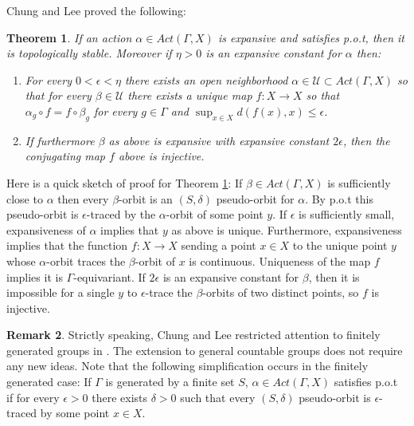 \documentclass[oneside,english]{amsart}
\newtheorem{thm}{Theorem}[section]
\theoremstyle{definition}
\newtheorem{remark}[thm]{Remark}
\newcommand{\Act}[2]{\mathit{Act}({#1},{#2})}
\begin{document}
Chung and Lee \cite[Theorem $2.8$]{1611.08994} proved the following:

\begin{thm}\label{thm:pot_stable}
If an action $\alpha \in \Act{\Gamma}{X}$ is expansive and satisfies p.o.t, then it is topologically stable.
Moreover if $\eta >0$ is an expansive constant for $\alpha$ then:
\begin{enumerate}
\item  For every $0 < \epsilon < \eta$ there exists an open neighborhood $\alpha \in \mathcal{U} \subset \Act{\Gamma}{X}$ so that for every $\beta \in \mathcal{U}$ there exists a unique map $f:X \to X$ so that $\alpha_g \circ f = f \circ \beta_g$ for every $g \in \Gamma$ and $\sup_{x \in X}d(f(x),x) \le \epsilon$.
\item If furthermore $\beta$ as above is expansive with expansive constant  $2\epsilon$, then the conjugating map $f$ above is injective.
\end{enumerate}
\end{thm}

Here is a quick sketch of  proof for Theorem \ref{thm:pot_stable}: If $\beta \in \Act{\Gamma}{X}$ is sufficiently close to $\alpha$ then every $\beta$-orbit is an $(S,\delta)$ pseudo-orbit for $\alpha$. By p.o.t this pseudo-orbit is  $\epsilon$-traced by the $\alpha$-orbit of some point $y$. If $\epsilon$ is sufficiently small, expansiveness of $\alpha$ implies that $y$ as above is unique.  Furthermore, expansiveness implies that the function $f:X \to X$ sending a point $x \in X$ to the unique point $y$ whose $\alpha$-orbit traces the $\beta$-orbit of $x$ is continuous.
Uniqueness of the map $f$  implies it is $\Gamma$-equivariant.
If $2\epsilon$ is an expansive constant for $\beta$, then it is impossible for a single $y$ to $\epsilon$-trace  the  $\beta$-orbits of two distinct  points, so $f$ is injective.

\begin{remark}
Strictly speaking,
 Chung and Lee restricted attention to finitely generated groups in \cite{1611.08994}.
The extension to general countable groups does not require any new ideas.
Note that the following simplification  occurs in the finitely generated case: If $\Gamma$ is generated by a finite set $S$, $\alpha \in \Act{\Gamma}{X}$ satisfies p.o.t if  for every $\epsilon >0$ there exists $\delta >0$   such that every $(S,\delta)$ pseudo-orbit is $\epsilon$-traced by some point $x \in X$.
\end{remark}
\end{document}
